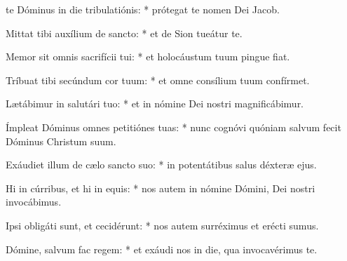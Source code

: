 \begin{psalmus}

 te Dóminus in die tribulatiónis: * prótegat te nomen Dei Jacob.

Mittat tibi auxílium de sancto: * et de Sion tueátur te.

Memor sit omnis sacrifícii tui: * et holocáustum tuum pingue fiat.

Tríbuat tibi secúndum cor tuum: * et omne consílium tuum confírmet.

Lætábimur in salutári tuo: * et in nómine Dei nostri magnificábimur.

Ímpleat Dóminus omnes petitiónes tuas: * nunc cognóvi quóniam salvum fecit Dóminus Christum suum.

Exáudiet illum de cælo sancto suo: * in potentátibus salus déxteræ ejus.

Hi in cúrribus, et hi in equis: * nos autem in nómine Dómini, Dei nostri invocábimus.

Ipsi obligáti sunt, et cecidérunt: * nos autem surréximus et erécti sumus.

Dómine, salvum fac regem: * et exáudi nos in die, qua invocavérimus te.

\end{psalmus}
